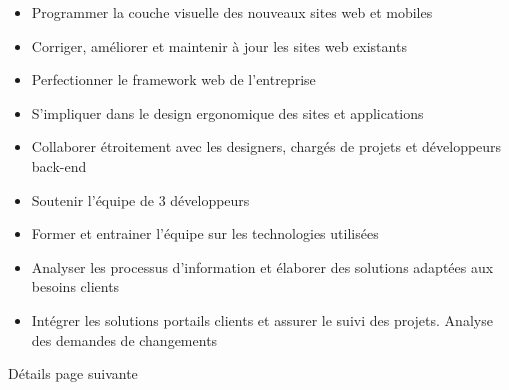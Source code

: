 \documentclass[10pt,a4paper]{altacv}
\begin{document}
\divider

\begin{itemize}
\item Programmer la couche visuelle des nouveaux sites web et mobiles
\item Corriger, améliorer et maintenir à jour les sites web existants
\item Perfectionner le framework web de l’entreprise
\item S’impliquer dans le design ergonomique des sites et applications
\item Collaborer étroitement avec les designers, chargés de projets et développeurs back-end
\end{itemize}

\divider

\begin{itemize}
\item Soutenir l’équipe de 3 développeurs
\item Former et entrainer l’équipe sur les technologies utilisées
\item Analyser les processus d’information et élaborer des solutions adaptées aux besoins clients
\item Intégrer les solutions portails clients et assurer le suivi des projets. Analyse des demandes de changements
\end{itemize}
\divider
{}


\hypertarget{page2}{Détails page suivante}
\clearpage
{}
\end{document}
